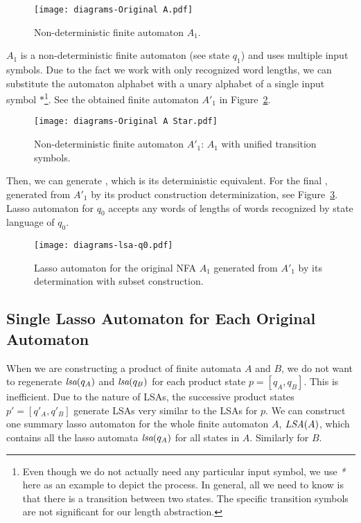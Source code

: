\begin{figure}[ht]
	\centering
	\texttt{[image: diagrams-Original A.pdf]}
	\caption{Non-deterministic finite automaton $A_1$.}
	\label{fig:NFA_A1_orig}
\end{figure}

$A_1$ is a non-deterministic finite automaton (see state $q_1$) and uses multiple input symbols. Due to the fact we work with only recognized word lengths, we can substitute the automaton alphabet with a unary alphabet of a single input symbol $*$\footnote{Even though we do not actually need any particular input symbol, we use \emph{*} here as an example to depict the process. In general, all we need to know is that there is a transition between two states. The specific transition symbols are not significant for our length abstraction.}. See the obtained finite automaton $A'_1$ in Figure~\ref{fig:NFA_A1_star}.

\begin{figure}[ht]
	\centering
	\texttt{[image: diagrams-Original A Star.pdf]}
	\caption{Non-deterministic finite automaton $A'_1$: $A_1$ with unified transition symbols.}
	\label{fig:NFA_A1_star}
\end{figure}

Then, we can generate , which is its deterministic equivalent. For the final , generated from $A'_1$ by its product construction determinization, see Figure~\ref{fig:HaL_A1}. Lasso automaton for $q_0$ accepts any words of lengths of words recognized by state language of $q_0$.

\begin{figure}[ht]
	\centering
	\texttt{[image: diagrams-lsa-q0.pdf]}
	\caption{Lasso automaton  for the original NFA $A_1$ generated from $A'_1$ by its determination with subset construction.}
	\label{fig:HaL_A1}
\end{figure}

\subsection{Single Lasso Automaton for Each Original Automaton}\label{sec:singleHaL}

When we are constructing a product of finite automata $A$ and $B$, we do not want to regenerate $\emph{lsa}(q_A)$ and $\emph{lsa}(q_B)$ for each product state $p = [q_A, q_B]$. This is inefficient. Due to the nature of LSAs, the successive product states $p' = [q'_A, q'_B]$ generate LSAs very similar to the LSAs for $p$. We can construct one summary lasso automaton for the whole finite automaton $A$, $\emph{LSA}(A)$, which contains all the lasso automata $\emph{lsa}(q_A)$ for all states in $A$. Similarly for $B$.

